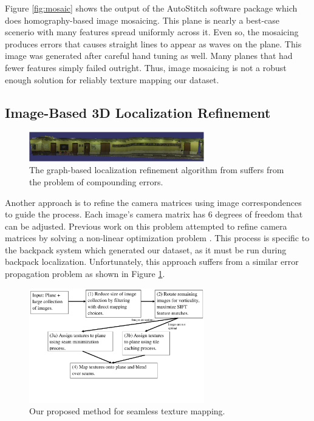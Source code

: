 \documentclass[10pt,twocolumn,letterpaper]{article}
\begin{document}
Figure \ref{fig:mosaic} shows the output of the AutoStitch software
package which does homography-based image mosaicing. This plane is
nearly a best-case scenerio with many features spread uniformly across
it. Even so, the mosaicing produces errors that causes straight lines
to appear as waves on the plane. This image was generated after
careful hand tuning as well. Many planes that had fewer features
simply failed outright. Thus, image mosaicing is not a robust enough
solution for reliably texture mapping our dataset.

\subsection{Image-Based 3D Localization Refinement}
\label{sec:imageBased3DRefinement}
\begin{figure}
  \centering
  \includegraphics[width=3in]{Graph_crop.pdf}
  \caption{The graph-based localization refinement algorithm from \cite{chen2010indoor}
    suffers from the problem of compounding errors. }
  \label{fig:graph}
\end{figure}

Another approach is to refine the camera matrices using image
correspondences to guide the process. Each image's camera matrix has 6
degrees of freedom that can be adjusted. Previous work on this problem
attempted to refine camera matrices by solving a non-linear
optimization problem \cite{liu2010indoor}. This process is specific to
the backpack system which generated our dataset, as it must be run
during backpack
localization\cite{liu2010indoor, chen2010indoor}. Unfortunately, this
approach suffers from a similar error propagation problem as shown in
Figure \ref{fig:graph}.


\begin{figure}
  \centering
  \includegraphics[width=3in]{pipeline.pdf}
  \caption{Our proposed method for seamless texture mapping.}
  \label{fig:pipeline}
\end{figure}
\end{document}

